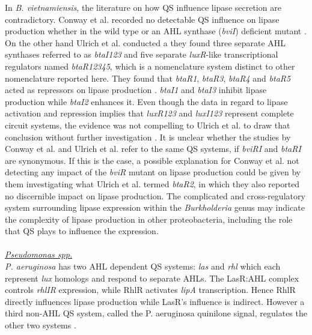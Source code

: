 \documentclass{article}
\begin{document}
In \emph{B. vietnamiensis}, the literature on how QS influence lipase secretion are contradictory. Conway et al. recorded no detectable QS influence on lipase production whether in the wild type or an AHL synthase (\emph{bviI}) deficient mutant \cite{conway_02}. On the other hand Ulrich et al. conducted a they found three separate AHL synthases referred to as \emph{btaI123} and five separate \emph{luxR}-like transcriptional regulators named \emph{btaR12345}, which is a nomenclature system distinct to other nomenclature reported here. They found that \emph{btaR1}, \emph{btaR3}, \emph{btaR4} and \emph{btaR5} acted as repressors on lipase production \cite{ulrich2004}. \emph{btaI1} and \emph{btaI3} inhibit lipase production while \emph{btaI2} enhances it. Even though the data in regard to lipase activation and repression implies that \emph{luxR123} and \emph{luxI123} represent complete circuit systems, the evidence was not compelling to Ulrich et al. to draw that conclusion without further investigation \cite{ulrich2004}.
It is unclear whether the studies by Conway et al. and Ulrich et al. refer to the same QS systems, if \emph{bviRI} and \emph{btaRI} are synonymous. If this is the case, a possible explanation for Conway et al. not detecting any impact of the \emph{bviR} mutant on lipase production could be given by them investigating what Ulrich et al. termed \emph{btaR2}, in which they also reported no discernible impact on lipase production. 
The complicated and cross-regulatory system surrounding lipase expression within the \emph{Burkholderia} genus may indicate the complexity of lipase production in other proteobacteria, including the role that QS plays to influence the expression.
\\
\\ \emph{\underline{Pseudomonas spp.}}
\\ \emph{P. aeruginosa} has two AHL dependent QS systems: \emph{las} and \emph{rhl} which each represent \emph{lux} homologs and respond to separate AHLs. The LasR:AHL complex controls \emph{rhlIR} expression, while RhlR activates \emph{lipA} transcription. Hence RhlR directly influences lipase production while LasR's influence is indirect. However a third non-AHL QS system, called the P. aeruginosa quinilone signal, regulates the other two systems \cite{juhas2005}. 
\end{document}
